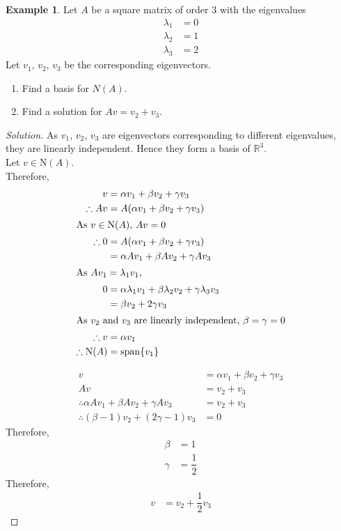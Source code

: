 \documentclass[fleqn, a4paper, 12pt]{article}
\newcommand{\N}{\mathrm{N}}
\theoremstyle{definition}
\newtheorem{example}{Example}
\theoremstyle{theorem}
\newenvironment{solution}
{\begin{proof}[Solution]\let\qed\relax}
	{\end{proof}}
\DeclareMathOperator{\vspan}{\mathrm{span}} %
\begin{document}
\begin{example}
	Let $A$ be a square matrix of order 3 with the eigenvalues 
	\begin{align*}
		\lambda_1 &= 0\\
		\lambda_2 &= 1\\
		\lambda_3 &= 2
	\end{align*}
	Let $v_1$, $v_2$, $v_3$ be the corresponding eigenvectors.
	\begin{enumerate}
		\item Find a basis for $N(A)$.
		\item Find a solution for $A v = v_2 + v_3$.
	\end{enumerate}
\end{example}

\begin{solution}
	As $v_1$, $v_2$, $v_3$ are eigenvectors corresponding to different eigenvalues, they are linearly independent. Hence they form a basis of $\mathbb{R}^3.$\\
	Let $v \in \N (A)$.\\
	Therefore,
	\begin{align*}
		v &= \alpha v_1 + \beta v_2 + \gamma v_3\\
		\therefore A v &= A(\alpha v_1 + \beta v_2 + \gamma v_3)\\
		\intertext{As $v \in \N (A)$, $ A v = 0$}
		\therefore 0 &= A(\alpha v_1 + \beta v_2 + \gamma v_3)\\
		&= \alpha A v_1 + \beta A v_2 + \gamma A v_3\\
		\intertext{As $A v_1 = \lambda_1 v_1$,}
		0 &= \alpha \lambda_1 v_1 + \beta \lambda_2 v_2 + \gamma \lambda_3 v_3\\
		&= \beta v_2 + 2 \gamma v_3\\
		\intertext{As $v_2$ and $v_3$ are linearly independent, $\beta = \gamma = 0$}
		\therefore v &= \alpha v_1\\
		\therefore \N (A) &= \vspan \{v_1\}
	\end{align*}
	
	\begin{align*}
		v &= \alpha v_1 + \beta v_2 + \gamma v_3\\
		A v &= v_2 + v_3\\
		\therefore \alpha A v_1 + \beta A v_2 + \gamma A v_3 &= v_2 + v_3\\
		\therefore (\beta - 1) v_2 + (2 \gamma - 1) v_3 &= 0
	\end{align*}
	Therefore,
	\begin{align*}
		\beta &= 1\\
		\gamma &= \dfrac{1}{2}
	\end{align*}
	Therefore,
	\begin{align*}
		v &= v_2 + \dfrac{1}{2} v_3
	\end{align*}
\end{solution}
\end{document}
